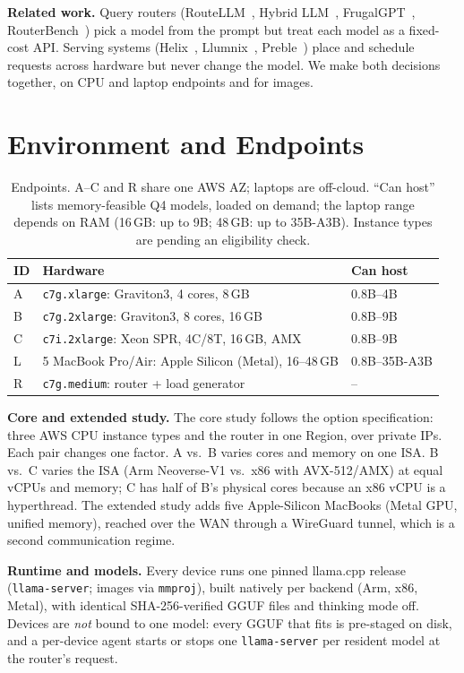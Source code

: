 \documentclass[10pt,twocolumn,letterpaper]{article}
\newcommand{\para}[1]{\textbf{#1}\hspace{0.4em}}
\begin{document}
\para{Related work.} Query routers (RouteLLM~\cite{routellm}, Hybrid
LLM~\cite{hybridllm}, FrugalGPT~\cite{frugalgpt}, RouterBench~\cite{routerbench})
pick a model from the prompt but treat each model as a fixed-cost API. Serving
systems (Helix~\cite{helix}, Llumnix~\cite{llumnix}, Preble~\cite{preble})
place and schedule requests across hardware but never change the model. We
make both decisions together, on CPU and laptop endpoints and for images.

\section{Environment and Endpoints}
\begin{table}[!htb]
\centering\footnotesize
\caption{Endpoints. A--C and R share one AWS AZ; laptops are off-cloud.
``Can host'' lists memory-feasible Q4 models, loaded on demand; the laptop
range depends on RAM (16\,GB: up to 9B; 48\,GB: up to 35B-A3B). Instance types
are pending an eligibility check.}
\label{tab:endpoints}
\begin{tabularx}{\columnwidth}{@{}lXl@{}}
\toprule
ID & Hardware & Can host \\
\midrule
A & \texttt{c7g.xlarge}: Graviton3, 4 cores, 8\,GB & 0.8B--4B \\
B & \texttt{c7g.2xlarge}: Graviton3, 8 cores, 16\,GB & 0.8B--9B \\
C & \texttt{c7i.2xlarge}: Xeon SPR, 4C/8T, 16\,GB, AMX & 0.8B--9B \\
L & 5 MacBook Pro/Air: Apple Silicon (Metal), 16--48\,GB & 0.8B--35B-A3B \\
R & \texttt{c7g.medium}: router + load generator & -- \\
\bottomrule
\end{tabularx}
\end{table}

\para{Core and extended study.} The core study follows the option
specification: three AWS CPU instance types and the router in one Region, over
private IPs. Each pair changes one factor. A vs.\ B varies cores and memory on
one ISA. B vs.\ C varies the ISA (Arm Neoverse-V1 vs.\ x86 with AVX-512/AMX) at
equal vCPUs and memory; C has half of B's physical cores because an x86 vCPU
is a hyperthread. The extended study adds five Apple-Silicon MacBooks (Metal
GPU, unified memory), reached over the WAN through a WireGuard tunnel, which is
a second communication regime.

\para{Runtime and models.} Every device runs one pinned llama.cpp
release~\cite{llamacpp} (\texttt{llama-server}; images via \texttt{mmproj}),
built natively per backend (Arm, x86, Metal), with identical SHA-256-verified
GGUF files and thinking mode off. Devices are \emph{not} bound to one model: every GGUF that
fits is pre-staged on disk, and a per-device agent starts or stops one
\texttt{llama-server} per resident model at the router's request.
\end{document}
